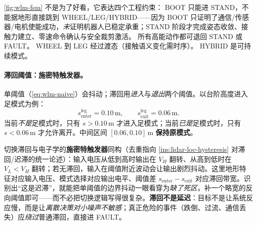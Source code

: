 \noindent\cref{fig:wlm-fsm} 不是为了好看，它表达四个工程约束： BOOT 只能进 STAND，不能据地形直接跳到 WHEEL/LEG/HYBRID——因为 BOOT 只证明了通信/传感器/电机使能成功，\emph{未}证明机器人已稳定承重；STAND 阶段才完成姿态收敛、接触力建立、零速命令确认与安全裁剪激活。 所有高能动作都可退回 STAND 或 FAULT。 WHEEL 到 LEG 经过渡态（接触语义变化需时序）。 HYBRID 是可持续模式。

\paragraph{滞回阈值：施密特触发器。}
单阈值（\cref{eq:wlm-naive}）会抖动；滞回用\emph{进入}与\emph{退出}两个阈值。以台阶高度进入足模式为例：
\begin{equation}
  s_{\mathrm{enter}}^{\mathrm{leg}}=0.10\,\mathrm m,\qquad s_{\mathrm{exit}}^{\mathrm{leg}}=0.06\,\mathrm m.
  \label{eq:wlm-hysteresis}
\end{equation}
当前\emph{不是}足模式时，只有 $s>0.10\,$m 才进入足模式；当前\emph{已是}足模式时，只有 $s<0.06\,$m 才允许离开。中间区间 $[0.06,0.10]\,$m \textbf{保持原模式}。

\begin{insight}[模式切换滞回 $=$ 施密特触发器]\label{ins:wlm-schmitt}
切换滞回与电子学的\textbf{施密特触发器}同构（去重指向 \cref{ins:lidar-loc-hysteresis} 对滞回/迟滞的统一论述）：输入电压从低到高时输出在 $V_H$ 翻转、从高到低时在 $V_L<V_H$ 翻转；若无滞回，输入在阈值附近波动会让输出剧烈抖动。这里地形特征对应输入电压、模式选择对应输出电平、阈值差 $s_{\mathrm{enter}}-s_{\mathrm{exit}}$ 对应滞回带宽。识别出“这是迟滞”，就能把单阈值的边界抖动一眼看穿为\emph{缺了死区}，补一个略宽的反向阈值即可——而不必把切换逻辑写得很复杂。\textbf{滞回不是延迟}：目标不是让系统反应慢，而是让\emph{离散决策对小噪声不敏感}；真正危险的事件（跌倒、过流、通信丢失）应\emph{绕过}普通滞回，直接进 FAULT。
\end{insight}

\begin{center}
\small
{}
\end{center}

